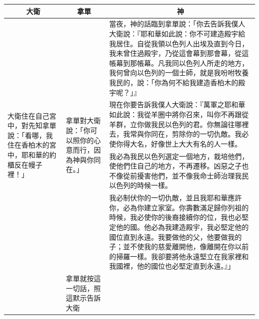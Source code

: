 \begin{table}[H]
\hspace{-12mm}
\centering
\begin{tabular}{p{1.25cm}|p{2.2cm}|p{13.75cm}}\hline\hline
\multicolumn{1}{c|}{大衛}&\multicolumn{1}{c|}{拿單}&\multicolumn{1}{c}{神}\\\hline
\multirow{4}{1.4cm}{大衛住在自己宮中，對先知拿單說：「看哪，我住在香柏木的宮中，耶和華的約櫃反在幔子裡！」}
&\multirow{4}{2.35cm}{拿單對大衛說：「你可以照你的心意而行，因為神與你同在。」}
&當夜，神的話臨到拿單說：「你去告訴我僕人大衛說：『耶和華如此說：你不可建造殿宇給我居住。自從我領以色列人出埃及直到今日，我未曾住過殿宇，乃從這會幕到那會幕，從這帳幕到那帳幕。凡我同以色列人所走的地方，我何曾向以色列的一個士師，就是我吩咐牧養我民的，說：「你為何不給我建造香柏木的殿宇呢？」』\\\cline{3-3}
&&現在你要告訴我僕人大衛說：『萬軍之耶和華如此說：我從羊圈中將你召來，叫你不再跟從羊群，立你做我民以色列的君。你無論往哪裡去，我常與你同在，剪除你的一切仇敵。我必使你得大名，好像世上大大有名的人一樣。\\\cline{3-3}
&&我必為我民以色列選定一個地方，栽培他們，使他們住自己的地方，不再遷移。凶惡之子也不像從前擾害他們，並不像我命士師治理我民以色列的時候一樣。\\\cline{3-3}
&&我必制伏你的一切仇敵，並且我耶和華應許你，必為你建立家室。你壽數滿足歸你列祖的時候，我必使你的後裔接續你的位，我也必堅定他的國。他必為我建造殿宇，我必堅定他的國位直到永遠。我要做他的父，他要做我的子；並不使我的慈愛離開他，像離開在你以前的掃羅一樣。我卻要將他永遠堅立在我家裡和我國裡，他的國位也必堅定直到永遠。』」\\\hline
&拿單就按這一切話，照這默示告訴大衛& \\\hline
\end{tabular}
\end{table}	 


